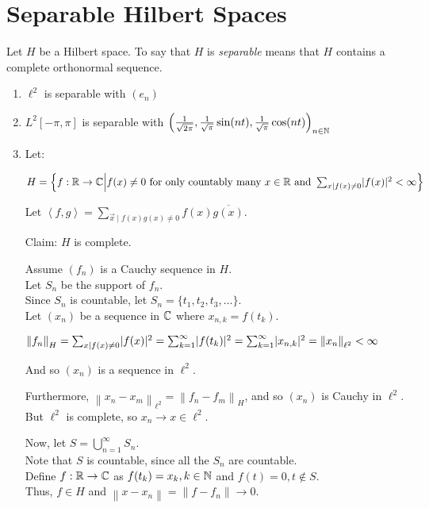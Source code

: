 \documentclass[letterpaper,12pt,fleqn]{article}
\newcommand{\vx}{\vec{x}}
\newcommand{\norm}[1]{\left\|#1\right\|}
\newcommand{\inner}[1]{\left<#1\right>}
\newcommand{\conj}[1]{\overline{#1}}
\begin{document}
\section*{Separable Hilbert Spaces}

\begin{definition}[Separable]
  Let $H$ be a Hilbert space. To say that $H$ is \emph{separable} means that
  $H$ contains a complete orthonormal sequence.
\end{definition}

\begin{examples}
  \listbreak
  \begin{enumerate}
  \item $\ell^2$ is separable with $(e_n)$

  \item $L^2[-\pi,\pi]$ is separable with
    $\left(\frac{1}{\sqrt{2\pi}},\frac{1}{\sqrt{\pi}}\sin(nt),
    \frac{1}{\sqrt{\pi}}\cos(nt)\right)_{n\in\mathbb{N}}$

  \item Let:
    
    $H=\left\{f:\R\to\C\middle|f(x)\ne0\ \mbox{for only countably many}
    \ x\in\R\ \mbox{and}\ \sum_{x\mid f(x)\ne0}\abs{f(x)}^2<\infty\right\}$

    Let $\inner{f,g}=\sum_{\vx\mid f(x)g(x)\ne0}f(x)\conj{g(x)}$.
    
    Claim: $H$ is complete.

    Assume $(f_n)$ is a Cauchy sequence in $H$. \\
    Let $S_n$ be the support of $f_n$. \\
    Since $S_n$ is countable, let $S_n=\{t_1,t_2,t_3,\ldots\}$. \\
    Let $(x_n)$ be a sequence in $\mathbb{C}$ where $x_{n,k}=f(t_k)$.

    $\norm{f_n}_H=\sum_{x\mid f(x)\ne0}\abs{f(x)}^2=
    \sum_{k=1}^{\infty}\abs{f(t_k)}^2=\sum_{k=1}^{\infty}\abs{x_{n,k}}^2=
    \norm{x_n}_{\ell^2}<\infty$

    And so $(x_n)$ is a sequence in $\ell^2$.

    Furthermore, $\norm{x_n-x_m}_{\ell^2}=\norm{f_n-f_m}_H$, and so $(x_n)$ is
    Cauchy in $\ell^2$. \\
    But $\ell^2$ is complete, so $x_n\to x\in\ell^2$.

    Now, let $S=\bigcup_{n=1}^{\infty}S_n$. \\
    Note that $S$ is countable, since all the $S_n$ are countable. \\
    Define $f:\mathbb{R}\to\mathbb{C}$ as $f(t_k)=x_k, k\in\mathbb{N}$ and $f(t)=0,t\notin S$. \\
    Thus, $f\in H$ and $\norm{x-x_n}=\norm{f-f_n}\to0$.


\end{enumerate}
\end{examples}
\end{document}
